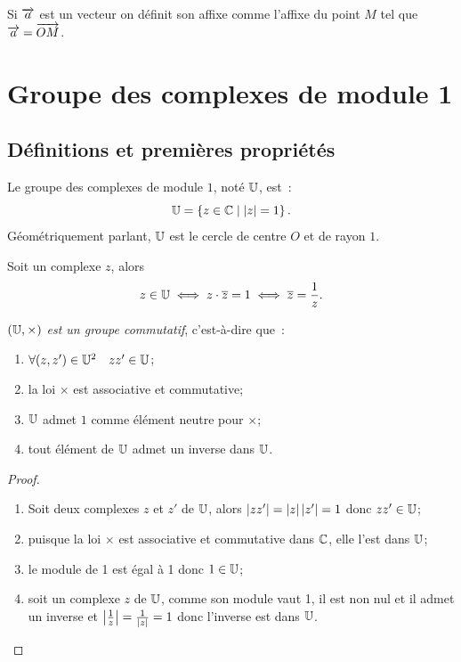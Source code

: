 Si \(\overrightarrow{a}\) est un vecteur on définit son affixe comme l'affixe du point
\(M\) tel que \(\overrightarrow{a} = \overrightarrow{OM}\).

\section{Groupe des complexes de module 1}\label{sec:groupeU}

\subsection{Définitions et premières propriétés}\label{subsec:groupeU-defetprop}

\begin{defdef}
  Le groupe des complexes de module \(1\), noté \(\mathbb{U}\), est~:
  \begin{equation}
    \mathbb{U} = \left\{z \in{}\mathbb{C}\mathrel{}\middle|\mathrel{}\left\lvert z\right\rvert = 1\right\}.
  \end{equation}
  Géométriquement parlant, \(\mathbb{U}\) est le cercle de centre \(O\) et de rayon
  \(1\).
\end{defdef}

\begin{prop}
  Soit un complexe \(z\), alors
  \begin{equation}
    z \in{}\mathbb{U} \iff z \cdot \overline{z} = 1 \iff \overline{z} = \frac{1}{z}.
  \end{equation}
\end{prop}

\begin{prop}
  \emph{\((\mathbb{U}, \times)\) est un groupe commutatif}, c'est-à-dire que~:
  \begin{enumerate}
    \item \(\forall (z,z') \in{}\mathbb{U}^2 \quad zz' \in{}\mathbb{U}\);
    \item la loi \(\times\) est associative et commutative;
    \item \(\mathbb{U}\) admet \(1\) comme élément neutre pour \(\times\);
    \item tout élément de \(\mathbb{U}\) admet un inverse dans \(\mathbb{U}\).
  \end{enumerate}
\end{prop}

\begin{proof}
  \begin{enumerate}
    \item Soit deux complexes \(z\) et \(z'\) de \(\mathbb{U}\), alors \(\left\lvert zz'\right\rvert =
      \left\lvert z\right\rvert\left\lvert z'\right\rvert = 1\) donc \(zz' \in{}\mathbb{U}\);
    \item puisque la loi \(\times\) est associative et commutative dans
      \(\mathbb{C}\), elle l'est dans \(\mathbb{U}\);
    \item le module de 1 est égal à 1 donc \(1 \in{}\mathbb{U}\);
    \item soit un complexe \(z\) de \(\mathbb{U}\), comme son module vaut 1, il est
      non nul et il admet un inverse et \(\left\lvert\frac{1}{z}\right\rvert =
      \frac{1}{\left\lvert z\right\rvert} = 1\) donc l'inverse est dans \(\mathbb{U}\).
  \end{enumerate}
\end{proof}

